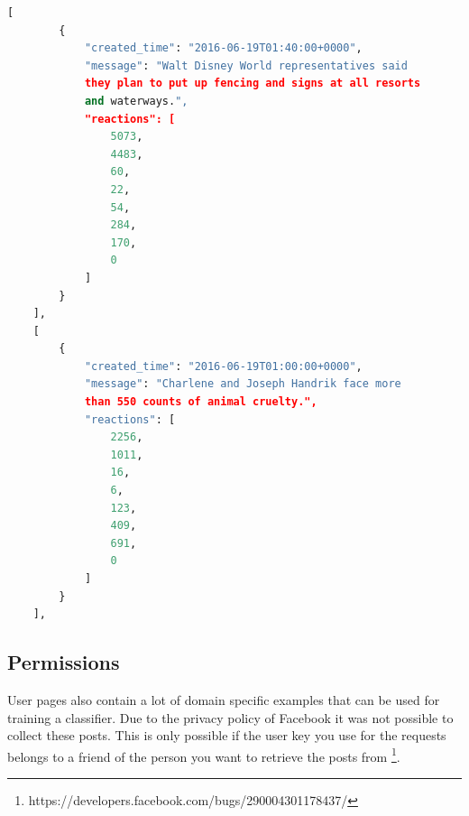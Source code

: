 \documentclass[11pt]{article}
\begin{document}
\begin{lstlisting}[language=Python, caption=Example JSON data]
[
        {
            "created_time": "2016-06-19T01:40:00+0000",
            "message": "Walt Disney World representatives said
            they plan to put up fencing and signs at all resorts
            and waterways.",
            "reactions": [
                5073,
                4483,
                60,
                22,
                54,
                284,
                170,
                0
            ]
        }
    ],
    [
        {
            "created_time": "2016-06-19T01:00:00+0000",
            "message": "Charlene and Joseph Handrik face more
            than 550 counts of animal cruelty.",
            "reactions": [
                2256,
                1011,
                16,
                6,
                123,
                409,
                691,
                0
            ]
        }
    ],
\end{lstlisting}

\subsection{Permissions}
User pages also contain a lot of domain specific examples that can be used for training a classifier. Due to the privacy policy of Facebook it was not possible to collect these posts. This is only possible if the user key you use for the requests belongs to a friend of the person you want to retrieve the posts from \footnote{https://developers.facebook.com/bugs/290004301178437/}. 
\end{document}
